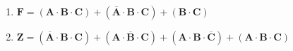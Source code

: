 \documentclass[12pt]{article}
\begin{document}
\begin{enumerate}[label = \textbf{\alph*.}]
\begin{enumerate}[label = \textbf{\arabic*.}]
                    \item $\mathbf{F = (A \cdot B \cdot C) + (\overline{A} \cdot B \cdot C) + (B \cdot C)}$
                    
                    \item $\mathbf{Z = (\overline{A} \cdot B \cdot C) + (A \cdot \overline{B} \cdot C) + (A \cdot B \cdot \overline{C}) + (A \cdot B \cdot C)}$
                \end{enumerate}

        \end{enumerate}
\end{document}

